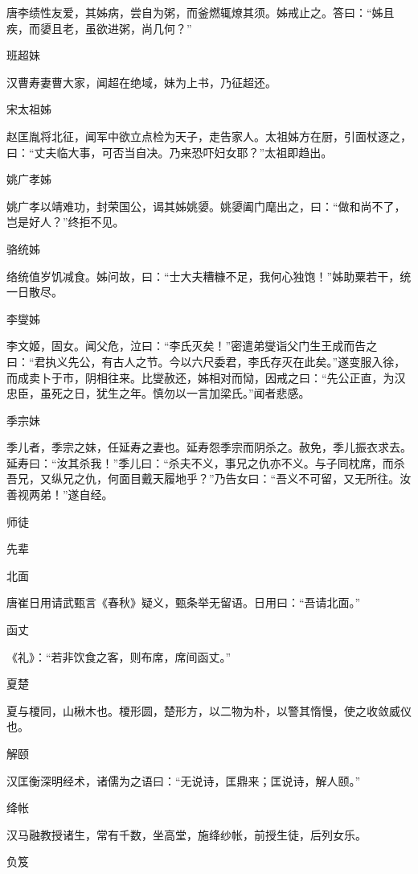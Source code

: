 \documentclass[a4paper,12pt,UTF8,twoside]{ctexbook}
\begin{document}
    唐李绩性友爱，其姊病，尝自为粥，而釜燃辄燎其须。姊戒止之。答曰：“姊且疾，而嬃且老，虽欲进粥，尚几何？”
    
    班超妹
    
    汉曹寿妻曹大家，闻超在绝域，妹为上书，乃征超还。
    
    宋太祖姊
    
    赵匡胤将北征，闻军中欲立点检为天子，走告家人。太祖姊方在厨，引面杖逐之，曰：“丈夫临大事，可否当自决。乃来恐吓妇女耶？”太祖即趋出。
    
    姚广孝姊
    
    姚广孝以靖难功，封荣国公，谒其姊姚嬃。姚嬃阖门麾出之，曰：“做和尚不了，岂是好人？”终拒不见。
    
    骆统姊
    
    络统值岁饥减食。姊问故，曰：“士大夫糟糠不足，我何心独饱！”姊助粟若干，统一日散尽。
    
    李燮姊
    
    李文姬，固女。闻父危，泣曰：“李氏灭矣！”密遣弟燮诣父门生王成而告之曰：“君执义先公，有古人之节。今以六尺委君，李氏存灭在此矣。”遂变服入徐，而成卖卜于市，阴相往来。比燮赦还，姊相对而恸，因戒之曰：“先公正直，为汉忠臣，虽死之日，犹生之年。慎勿以一言加梁氏。”闻者悲感。
    
    季宗妹
    
    季儿者，季宗之妹，任延寿之妻也。延寿怨季宗而阴杀之。赦免，季儿振衣求去。延寿曰：“汝其杀我！”季儿曰：“杀夫不义，事兄之仇亦不义。与子同枕席，而杀吾兄，又纵兄之仇，何面目戴天履地乎？”乃告女曰：“吾义不可留，又无所往。汝善视两弟！”遂自经。
    
    师徒
    
    先辈
    
    北面
    
    唐崔日用请武甄言《春秋》疑义，甄条举无留语。日用曰：“吾请北面。”
    
    函丈
    
    《礼》：“若非饮食之客，则布席，席间函丈。”
    
    夏楚
    
    夏与榎同，山楸木也。榎形圆，楚形方，以二物为朴，以警其惰慢，使之收敛威仪也。
    
    解颐
    
    汉匡衡深明经术，诸儒为之语曰：“无说诗，匡鼎来；匡说诗，解人颐。”
    
    绛帐
    
    汉马融教授诸生，常有千数，坐高堂，施绛纱帐，前授生徒，后列女乐。
    
    负笈
    
\end{document}
